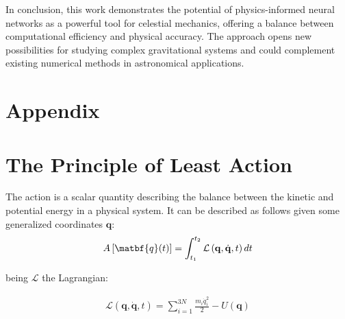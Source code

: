 \documentclass[draft]{agujournal2019}
\begin{document}
In conclusion, this work demonstrates the potential of physics-informed neural networks as a powerful tool for celestial mechanics, offering a balance between computational efficiency and physical accuracy. The approach opens new possibilities for studying complex gravitational systems and could complement existing numerical methods in astronomical applications.

\section{Appendix}
\appendix
\section{The Principle of Least Action}
\begin{definition}
    The action is a scalar quantity describing the balance between the kinetic and potential energy in a physical system. It can be described as follows given some generalized coordinates $\mathbf{q}$:
    \begin{align}
        A\left[ \matbf{q}(t) \right] = \int_{t_1}^{t_2} \mathcal{L}\left(\mathbf{q}, \dot{\mathbf{q}}, t\right) dt
    \end{align}
\end{definition}

being $\mathcal{L}$ the Lagrangian:

\begin{align}
    \mathcal{L} \left(\mathbf{q}, \dot{\mathbf{q}}, t \right) = \sum_{i = 1}^{3N} \frac{m_i \dot{q}_i^2}{2} - U(\mathbf{q})
\end{align}
\end{document}
